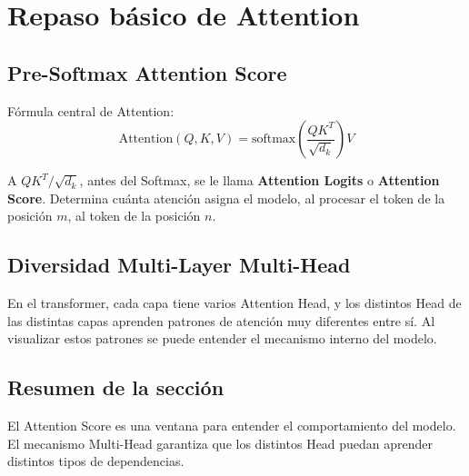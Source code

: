 \section{Repaso básico de Attention}

\subsection{Pre-Softmax Attention Score}

Fórmula central de Attention:
$$
\text{Attention}(Q, K, V) = \text{softmax}\left(\frac{QK^T}{\sqrt{d_k}}\right) V
$$

A $QK^T / \sqrt{d_k}$, antes del Softmax, se le llama \textbf{Attention Logits} o \textbf{Attention Score}. Determina cuánta atención asigna el modelo, al procesar el token de la posición $m$, al token de la posición $n$.

\subsection{Diversidad Multi-Layer Multi-Head}

En el transformer, cada capa tiene varios Attention Head, y los distintos Head de las distintas capas aprenden patrones de atención muy diferentes entre sí. Al visualizar estos patrones se puede entender el mecanismo interno del modelo.

\subsection{Resumen de la sección}

El Attention Score es una ventana para entender el comportamiento del modelo. El mecanismo Multi-Head garantiza que los distintos Head puedan aprender distintos tipos de dependencias.

